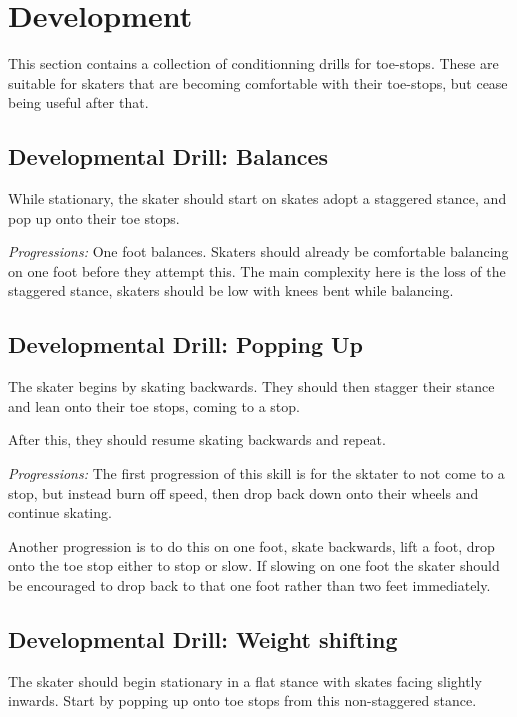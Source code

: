 \section{Development}
\label{sec:toe_stop/development}

This section contains a collection of conditionning drills for toe-stops. 
These are suitable for skaters that are becoming comfortable with their toe-stops, but cease being useful after that.   


\subsection*{Developmental Drill: Balances}
\label{drill:toe_stop/balances}

While stationary, the skater should start on skates adopt a staggered stance, and pop up onto their toe stops. 

{\it Progressions:}
One foot balances.
Skaters should already be comfortable balancing on one foot before they attempt this.
The main complexity here is the loss of the staggered stance, skaters should be low with knees bent while balancing.


\subsection*{Developmental Drill: Popping Up}
\label{drill:toe_stop/popping_up}
The skater begins by skating backwards.
They should then stagger their stance and lean onto their toe stops, coming to a stop. 

After this, they should resume skating backwards and repeat.


{\it Progressions:}
The first progression of this skill is for the sktater to not come to a stop, but instead burn off speed, then drop back down onto their wheels and continue skating.


Another progression is to do this on one foot, skate backwards, lift a foot, drop onto the toe stop either to stop or slow. 
If slowing on one foot the skater should be encouraged to drop back to that one foot rather than two feet immediately.   



\subsection*{Developmental Drill: Weight shifting}
\label{drill:toe_stop/weight_shift}
The skater should begin stationary in a flat stance with skates facing slightly inwards.
Start by popping up onto toe stops from this non-staggered stance.

